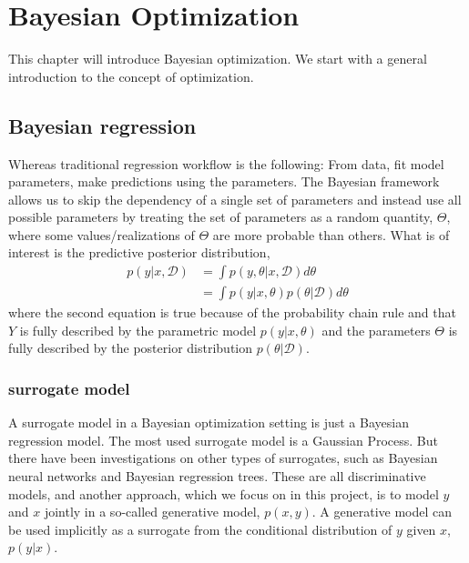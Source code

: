 \chapter{Bayesian Optimization}
This chapter will introduce Bayesian optimization. We start with a general introduction to 
the concept of optimization. 






\section{Bayesian regression}

Whereas traditional regression workflow is the following: From data, fit model parameters, make
predictions using the parameters. The Bayesian framework allows us to skip the dependency of a
single set of parameters and instead use all possible parameters by treating the set of parameters
as a random quantity, $\Theta$, where some values/realizations of $\Theta$ are more probable than
others. What is of interest is the predictive posterior distribution,  
\begin{align}\label{Predictive2}
    p(y|x, \mathcal{D}) &= \int p(y,\theta|x, \mathcal{D}) d\theta\\
    &= \int p(y|x,\theta)p(\theta|\mathcal{D}) d\theta
\end{align}
where the second equation is true because of the probability chain rule and that $Y$ is fully
described by the parametric model $p(y|x,\theta)$ and the parameters $\Theta$ is fully described by
the posterior distribution $p(\theta|\mathcal{D})$.

\subsection{surrogate model}
A surrogate model in a Bayesian optimization setting is just a Bayesian regression model. The most
used surrogate model is a Gaussian Process. But there have been investigations on other types of
surrogates, such as Bayesian neural networks and Bayesian regression trees. These are all
discriminative models, and another approach, which we focus on in this project, is to model $y$ and
$x$ jointly in a so-called generative model, $p(x,y)$. A generative model can be used implicitly
as a surrogate from the conditional distribution of $y$ given $x$, $p(y|x)$.

